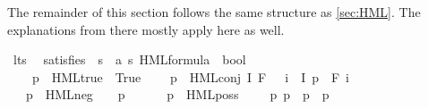 \begin{isabellebody}
\begin{isamarkuptext}
The remainder of this section follows the same structure as \cref{sec:HML}. The explanations from there mostly apply here as well.%
\end{isamarkuptext}\isamarkuptrue%
\isamarkupfalse%
\ lts\ \isanewline
\isanewline
{}\isamarkupfalse%
\ satisfies\ {\isacharcolon}{\kern0pt}{\isacharcolon}{\kern0pt}\ {\isacartoucheopen}{\isacharprime}{\kern0pt}s\ {\isasymRightarrow}\ {\isacharparenleft}{\kern0pt}{\isacharprime}{\kern0pt}a{\isacharcomma}{\kern0pt}\ {\isacharprime}{\kern0pt}s{\isacharparenright}{\kern0pt}\ HML{\isacharunderscore}{\kern0pt}formula\ {\isasymRightarrow}\ bool{\isacartoucheclose}\ \isanewline
\ \ {\isacharparenleft}{\kern0pt}{\isacartoucheopen}{\isacharunderscore}{\kern0pt}\ {\isasymTurnstile}\ {\isacharunderscore}{\kern0pt}{\isacartoucheclose}\ {\isacharbrackleft}{\kern0pt}{}{}{\isacharcomma}{\kern0pt}\ {}{}{\isacharbrackright}{\kern0pt}\ {}{}{\isacharparenright}{\kern0pt}\isanewline
\ \ \isanewline
\ \ \ \ {\isacartoucheopen}{\isacharparenleft}{\kern0pt}p\ {\isasymTurnstile}\ HML{\isacharunderscore}{\kern0pt}true{\isacharparenright}{\kern0pt}\ {\isacharequal}{\kern0pt}\ True{\isacartoucheclose}\ \isanewline
\ \ {\isacharbar}{\kern0pt}\ {\isacartoucheopen}{\isacharparenleft}{\kern0pt}p\ {\isasymTurnstile}\ HML{\isacharunderscore}{\kern0pt}conj\ I\ F{\isacharparenright}{\kern0pt}\ {\isacharequal}{\kern0pt}\ {\isacharparenleft}{\kern0pt}{\isasymforall}\ i\ {\isasymin}\ I{\isachardot}{\kern0pt}\ p\ {\isasymTurnstile}\ {\isacharparenleft}{\kern0pt}F\ i{\isacharparenright}{\kern0pt}{\isacharparenright}{\kern0pt}{\isacartoucheclose}\ \isanewline
\ \ {\isacharbar}{\kern0pt}\ {\isacartoucheopen}{\isacharparenleft}{\kern0pt}p\ {\isasymTurnstile}\ HML{\isacharunderscore}{\kern0pt}neg\ {\isasymphi}{\isacharparenright}{\kern0pt}\ {\isacharequal}{\kern0pt}\ {\isacharparenleft}{\kern0pt}{\isasymnot}\ p\ {\isasymTurnstile}\ {\isasymphi}{\isacharparenright}{\kern0pt}{\isacartoucheclose}\ \isanewline
\ \ {\isacharbar}{\kern0pt}\ {\isacartoucheopen}{\isacharparenleft}{\kern0pt}p\ {\isasymTurnstile}\ HML{\isacharunderscore}{\kern0pt}poss\ {\isasymalpha}\ {\isasymphi}{\isacharparenright}{\kern0pt}\ {\isacharequal}{\kern0pt}\ {\isacharparenleft}{\kern0pt}{\isasymexists}\ p{\isacharprime}{\kern0pt}{\isachardot}{\kern0pt}\ p\ {\isasymlongmapsto}{\isasymalpha}\ p{\isacharprime}{\kern0pt}\ {\isasymand}\ p{\isacharprime}{\kern0pt}\ {\isasymTurnstile}\ {\isasymphi}{\isacharparenright}{\kern0pt}{\isacartoucheclose}\isanewline

\end{isabellebody}
